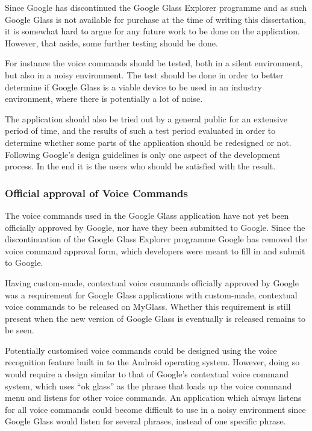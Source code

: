 Since Google has discontinued the Google Glass Explorer programme and as such Google Glass is not available for purchase at the time of writing this dissertation, it is somewhat hard to argue for any future work to be done on the application. However, that aside, some further testing should be done.

For instance the voice commands should be tested, both in a silent environment, but also in a noisy environment. The test should be done in order to better determine if Google Glass is a viable device to be used in an industry environment, where there is potentially a lot of noise. 

The application should also be tried out by a general public for an extensive period of time, and the results of such a test period evaluated in order to determine whether some parts of the application should be redesigned or not. Following Google's design guidelines is only one aspect of the development process. In the end it is the users who should be satisfied with the result.

\subsubsection{Official approval of Voice Commands}
The voice commands used in the Google Glass application have not yet been officially approved by Google, nor have they been submitted to Google. Since the discontinuation of the Google Glass Explorer programme Google has removed the voice command approval form, which developers were meant to fill in and submit to Google.

Having custom-made, contextual voice commands officially approved by Google was a requirement for Google Glass applications with custom-made, contextual voice commands to be released on MyGlass. Whether this requirement is still present when the new version of Google Glass is eventually is released remains to be seen.

Potentially customised voice commands could be designed using the voice recognition feature built in to the Android operating system. However, doing so would require a design similar to that of Google's contextual voice command system, which uses ``ok glass'' as the phrase that loads up the voice command menu and listens for other voice commands. An application which always listens for all voice commands could become difficult to use in a noisy environment since Google Glass would listen for several phrases, instead of one specific phrase.

